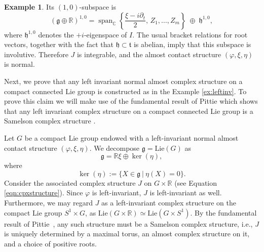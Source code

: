 \documentclass{article}
\theoremstyle{definition}
\newtheorem{ex}[thm]{Example}
\newcommand{\g}{\mathfrak{g}}
\newcommand{\R}{\mathbb{R}}
\newcommand{\C}{\mathbb{C}}
\renewcommand{\phi}{\varphi}
\numberwithin{equation}{section}
\begin{document}
\begin{ex}
Its $(1,0)$-subspace is
\[
(\mathfrak g\oplus\R)^{1,0}
=
\operatorname{span}_{\C}\!\left\{
\frac{\xi-i\partial_t}{2},\,
Z_1,\dots,Z_m
\right\}
\;\oplus\;
\mathfrak h^{1,0},
\]
where $\mathfrak h^{1,0}$ denotes the $+i$-eigenspace of $I$.
The usual bracket relations for root vectors, together with the fact that
$\mathfrak h\subset\mathfrak t$ is abelian, imply that this subspace is
involutive.  Therefore $J$ is integrable, and the almost contact structure
$(\phi,\xi,\eta)$ is normal.


\end{ex}
Next, we prove that any left invariant normal almost complex structure on a compact connected Lie group is constructed as in the Example \ref{ex:leftinv}. To prove this claim we will make use of the fundamental result of Pittie \cite{Pit} which shows that any left invariant complex structure on a compact connected Lie group is a Samelson complex structure \cite{Sam}.  \par

\medskip

Let $G$ be a compact Lie group endowed with a left-invariant normal almost contact structure $(\phi, \xi, \eta)$. We decompose $\mathfrak g = \mathrm{Lie}(G)$ as  
\[
\mathfrak g = \R\xi \oplus \ker(\eta),
\]  
where 
\[
\ker(\eta):=\{ X \in \g \ | \ \eta(X)=0\}.
\]
Consider the associated complex structure $J$ on $G \times \mathbb{R}$ (see Equation \eqref{eqn:cpxstructure}). Since $\phi$ is left-invariant, $J$ is left-invariant as well.  Furthermore, we may regard $J$ as a left-invariant complex structure on the compact Lie group $S^1 \times G$,  as $
\mathrm{Lie}(G \times \mathbb{R}) \simeq \mathrm{Lie}(G \times S^1)
$. By the fundamental result of Pittie~\cite{Pit}, any such structure must be a Samelson complex structure, i.e., $J$ is uniquely determined by a maximal torus, an almost complex structure on it, and a choice of positive roots.  
\end{document}
